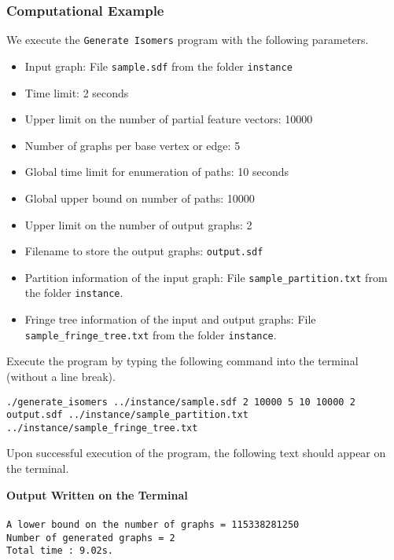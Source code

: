 \documentclass[11pt,titlepage,dvipdfmx,twoside]{article}
\begin{document}
\subsubsection{Computational Example}
\label{sec:instance_p}

We execute the {\tt Generate Isomers} program with the following parameters.

\begin{itemize}
\item Input graph: File {\tt sample.sdf} from the folder {\tt instance}
\item Time limit: 2 seconds
\item Upper limit on the number of partial feature vectors: 10000
\item Number of graphs per base vertex or edge: 5
\item Global time limit for enumeration of paths: 10 seconds
\item Global upper bound on number of paths: 10000
\item Upper limit on the number of output graphs: 2
\item Filename to store the output graphs: {\tt output.sdf}
\item Partition information of the input graph: 
File {\tt sample\_partition.txt} from the folder {\tt instance}.
\item Fringe tree information of the input and output graphs: 
File {\tt sample\_fringe\_tree.txt} from the folder {\tt instance}.
\end{itemize}

Execute the program by typing the following command into the terminal (without a line break).

\bigskip


{\tt ./generate\_isomers ../instance/sample.sdf 2 10000 5 10 10000 2} \\
 {\tt output.sdf ../instance/sample\_partition.txt }\\
 {\tt../instance/sample\_fringe\_tree.txt}
%
\bigskip

Upon successful execution of the program, the following text should appear on the terminal.

\begin{oframed}
{\bf Output Written on the Terminal}\\\\
{\tt A lower bound on the number of graphs = 115338281250\\
Number of generated graphs = 2\\
Total time : 9.02s.}
\end{oframed}
\end{document}
